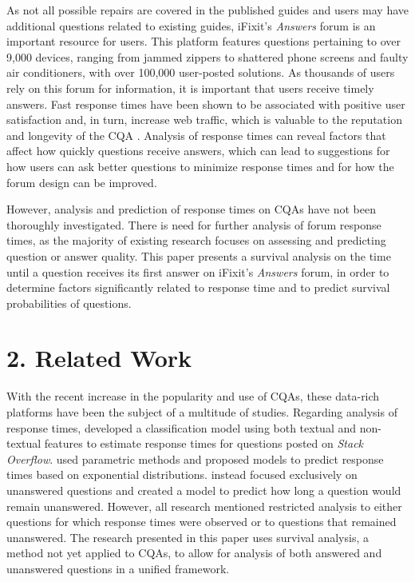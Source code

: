 \documentclass{article}
\begin{document}
As not all possible repairs are covered in the published guides and users may have additional questions related to existing guides, iFixit's \textit{Answers} forum is an important resource for users. This platform features questions pertaining to over 9,000 devices, ranging from jammed zippers to shattered phone screens and faulty air conditioners, with over 100,000 user-posted solutions. As thousands of users rely on this forum for information, it is important that users receive timely answers. Fast response times have been shown to be associated with positive user satisfaction and, in turn, increase web traffic, which is valuable to the reputation and longevity of the CQA \cite{Rechavi2011}. Analysis of response times can reveal factors that affect how quickly questions receive answers, which can lead to suggestions for how users can ask better questions to minimize response times and for how the forum design can be improved.

However, analysis and prediction of response times on CQAs have not been thoroughly investigated. There is need for further analysis of forum response times, as the majority of existing research focuses on assessing and predicting question or answer quality. This paper presents a survival analysis on the time until a question receives its first answer on iFixit's \textit{Answers} forum, in order to determine factors significantly related to response time and to predict survival probabilities of questions.


\section*{2. Related Work}
  
With the recent increase in the popularity and use of CQAs, these data-rich platforms have been the subject of a multitude of studies. Regarding analysis of response times, \cite{Bhat2014} developed a classification model using both textual and non-textual features to estimate response times for questions posted on \textit{Stack Overflow}. \cite{Mahmud2013} used parametric methods and proposed models to predict response times based on exponential distributions. \cite{Asaduzzaman2013} instead focused exclusively on unanswered questions and created a model to predict how long a question would remain unanswered. However, all research mentioned restricted analysis to either questions for which response times were observed or to questions that remained unanswered. The research presented in this paper uses survival analysis, a method not yet applied to CQAs, to allow for analysis of both answered and unanswered questions in a unified framework. 
\end{document}
